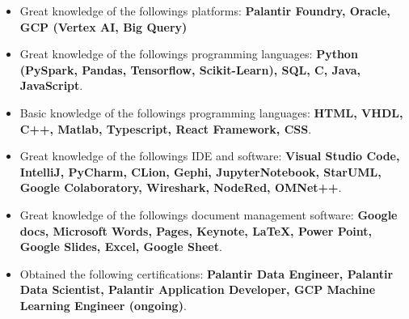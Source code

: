 \documentclass[10pt,a4paper]{altacv}
\begin{document}






\begin{itemize}
  \item Great knowledge of the followings platforms: \textbf{Palantir Foundry, Oracle, GCP (Vertex AI, Big Query)}
  \item Great knowledge of the followings programming languages: \textbf{Python (PySpark, Pandas, Tensorflow, Scikit-Learn), SQL, C, Java, JavaScript}.
  \item Basic knowledge of the followings programming languages: \textbf{HTML, VHDL, C++, Matlab, Typescript, React Framework, CSS}.
  \item Great knowledge of the followings IDE and software: \textbf{Visual Studio Code, IntelliJ, PyCharm, CLion, Gephi, JupyterNotebook, StarUML, Google Colaboratory, Wireshark, NodeRed, OMNet++}.
  \item Great knowledge of the followings document management software: \textbf{Google docs, Microsoft Words, Pages, Keynote, LaTeX, Power Point, Google Slides, Excel, Google Sheet}.
  \item Obtained the following certifications: \textbf{Palantir Data Engineer, Palantir Data Scientist, Palantir Application Developer, GCP Machine Learning Engineer (ongoing)}.
  
\end{itemize}





\end{document}
